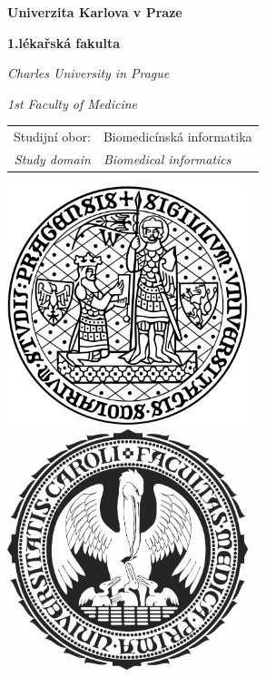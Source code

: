 \begin{center}
\large
\textbf{\Large{Univerzita Karlova v Praze}}

\textbf{\Large{1.lékařská fakulta}} 

\textit{Charles University in Prague} 

\textit{1st Faculty of Medicine}
\vfill
\normalsize
\begin{tabular}{rl}
Studijní obor:  & Biomedicínská informatika \\
\noalign{\vspace{-1mm}}
\textit{Study domain} & \textit{Biomedical informatics} \\
\end{tabular}

\vfill

\vspace{8mm}

\centerline{\mbox{\includegraphics[width=70mm]{img/logouk.png}
\includegraphics[width=70mm]{img/logolf1.png}}}

\vfill
\vspace{8mm}


\end{center}
